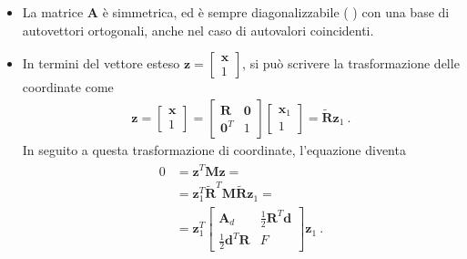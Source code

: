 \documentclass[letterpaper,10pt,italian]{jupyterBook}
\begin{document}
\begin{itemize}
\item {} 
\sphinxAtStartPar
La matrice \(\mathbf{A}\) è simmetrica, ed è sempre diagonalizzabile ( ) con una base di autovettori ortogonali, anche nel caso di autovalori coincidenti.

\item {} 
\sphinxAtStartPar
In termini del vettore esteso \(\mathbf{z} = \begin{bmatrix} \mathbf{x} \\ 1 \end{bmatrix}\), si può scrivere la trasformazione delle coordinate come
\begin{equation*}
\begin{split}\mathbf{z} = \begin{bmatrix} \mathbf{x} \\ 1 \end{bmatrix} = \begin{bmatrix} \mathbf{R} & \mathbf{0} \\ \mathbf{0}^T & 1 \end{bmatrix} \begin{bmatrix} \mathbf{x}_1 \\ 1 \end{bmatrix} = \widetilde{\mathbf{R}} \mathbf{z}_1 \ .\end{split}
\end{equation*}
\sphinxAtStartPar
In seguito a questa trasformazione di coordinate, l’equazione diventa
\begin{equation*}
\begin{split}\begin{aligned}
     0
     & = \mathbf{z}^T \mathbf{M} \mathbf{z} = \\
     & = \mathbf{z}^T_1 \widetilde{\mathbf{R}}^T \mathbf{M} \widetilde{\mathbf{R}} \mathbf{z}_1 = \\
     & = \mathbf{z}^T_1 \begin{bmatrix} \mathbf{A}_d & \frac{1}{2}\mathbf{R}^T \mathbf{d} \\ \frac{1}{2} \mathbf{d}^T \mathbf{R} & F \end{bmatrix}  \mathbf{z}_1 \ .
   \end{aligned}\end{split}
\end{equation*}
\end{itemize}
\end{document}
